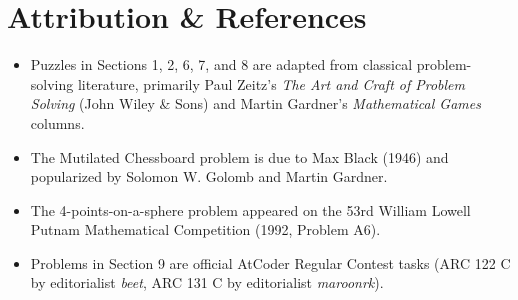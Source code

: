 \documentclass[12pt]{article}
\begin{document}
\section*{Attribution \& References}
\begin{itemize}
    \item Puzzles in Sections 1, 2, 6, 7, and 8 are adapted from classical problem-solving literature, primarily Paul Zeitz's \textit{The Art and Craft of Problem Solving} (John Wiley \& Sons) and Martin Gardner's \textit{Mathematical Games} columns.
    \item The Mutilated Chessboard problem is due to Max Black (1946) and popularized by Solomon W. Golomb and Martin Gardner.
    \item The 4-points-on-a-sphere problem appeared on the 53rd William Lowell Putnam Mathematical Competition (1992, Problem A6).
    \item Problems in Section 9 are official AtCoder Regular Contest tasks (ARC 122 C by editorialist \textit{beet}, ARC 131 C by editorialist \textit{maroonrk}).
\end{itemize}
\end{document}
